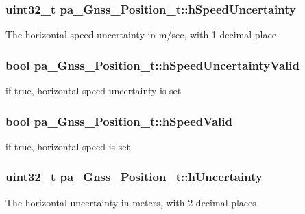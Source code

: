 \subsubsection[{\texorpdfstring{h\+Speed\+Uncertainty}{hSpeedUncertainty}}]{\setlength{\rightskip}{0pt plus 5cm}uint32\+\_\+t pa\+\_\+\+Gnss\+\_\+\+Position\+\_\+t\+::h\+Speed\+Uncertainty}\hypertarget{structpa___gnss___position__t_ad559e322f94d0e494540ae0e0ff56002}{}\label{structpa___gnss___position__t_ad559e322f94d0e494540ae0e0ff56002}
The horizontal speed uncertainty in m/sec, with 1 decimal place 
\subsubsection[{\texorpdfstring{h\+Speed\+Uncertainty\+Valid}{hSpeedUncertaintyValid}}]{\setlength{\rightskip}{0pt plus 5cm}bool pa\+\_\+\+Gnss\+\_\+\+Position\+\_\+t\+::h\+Speed\+Uncertainty\+Valid}\hypertarget{structpa___gnss___position__t_aca8965f7b4816b327e5872f935876aea}{}\label{structpa___gnss___position__t_aca8965f7b4816b327e5872f935876aea}


if true, horizontal speed uncertainty is set 

\subsubsection[{\texorpdfstring{h\+Speed\+Valid}{hSpeedValid}}]{\setlength{\rightskip}{0pt plus 5cm}bool pa\+\_\+\+Gnss\+\_\+\+Position\+\_\+t\+::h\+Speed\+Valid}\hypertarget{structpa___gnss___position__t_a252e335dd2b04fee22f3170d496b61ea}{}\label{structpa___gnss___position__t_a252e335dd2b04fee22f3170d496b61ea}


if true, horizontal speed is set 

\subsubsection[{\texorpdfstring{h\+Uncertainty}{hUncertainty}}]{\setlength{\rightskip}{0pt plus 5cm}uint32\+\_\+t pa\+\_\+\+Gnss\+\_\+\+Position\+\_\+t\+::h\+Uncertainty}\hypertarget{structpa___gnss___position__t_a9d7d33d52e812e7b2ade427b68df9530}{}\label{structpa___gnss___position__t_a9d7d33d52e812e7b2ade427b68df9530}
The horizontal uncertainty in meters, with 2 decimal places 
